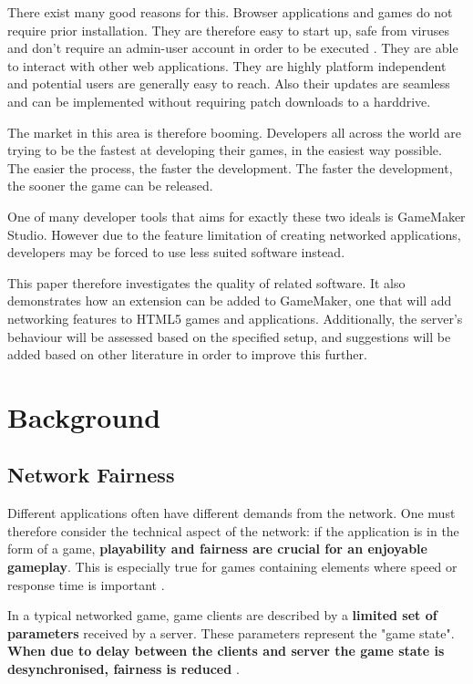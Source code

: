 \documentclass[bsc,frontabs,twoside,singlespacing,parskip,deptreport]{infthesis}     %
\begin{document}
There exist many good reasons for this. Browser applications and games do not require prior installation. They are therefore easy to start up, safe from viruses and don't require an admin-user account in order to be executed \cite{Web_Apps_Superior}. They are able to interact with other web applications. They are highly platform independent and potential users are generally easy to reach. Also their updates are seamless and can be implemented without requiring patch downloads to a harddrive.

The market in this area is therefore booming. Developers all across the world are trying to be the fastest at developing their games, in the easiest way possible. The easier the process, the faster the development. The faster the development, the sooner the game can be released.

One of many developer tools that aims for exactly these two ideals is GameMaker Studio. However due to the feature limitation of creating networked applications, developers may be forced to use less suited software instead. 

This paper therefore investigates the quality of related software. It also demonstrates how an extension can be added to GameMaker, one that will add networking features to HTML5 games and applications. Additionally, the server's behaviour will be assessed based on the specified setup, and suggestions will be added based on other literature in order to improve this further.

\chapter{Background}

\section{Network Fairness}
Different applications often have different demands from the network. One must therefore consider the technical aspect of the network: if the application is in the form of a game, \textbf{playability and fairness are crucial for an enjoyable gameplay}. This is especially true for games containing elements where speed or response time is important \cite{Fairness_and_Playability}.

In a typical networked game, game clients are described by a \textbf{limited set of parameters} received by a server. These parameters represent the "game state". \textbf{When due to delay between the clients and server the game state is desynchronised, fairness is reduced} \cite{Fairness_and_Playability}.
\end{document}
